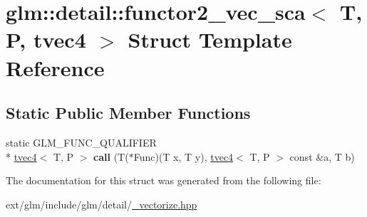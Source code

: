 \hypertarget{structglm_1_1detail_1_1functor2__vec__sca_3_01_t_00_01_p_00_01tvec4_01_4}{\section{glm\-:\-:detail\-:\-:functor2\-\_\-vec\-\_\-sca$<$ T, P, tvec4 $>$ Struct Template Reference}
\label{structglm_1_1detail_1_1functor2__vec__sca_3_01_t_00_01_p_00_01tvec4_01_4}
}
\subsection*{Static Public Member Functions}
\begin{DoxyCompactItemize}
\item 
\hypertarget{structglm_1_1detail_1_1functor2__vec__sca_3_01_t_00_01_p_00_01tvec4_01_4_ac8dcfe692f5b5d07ca805f981d58a913}{static G\-L\-M\-\_\-\-F\-U\-N\-C\-\_\-\-Q\-U\-A\-L\-I\-F\-I\-E\-R \\*
\hyperlink{structglm_1_1tvec4}{tvec4}$<$ T, P $>$ {\bfseries call} (T($\ast$Func)(T x, T y), \hyperlink{structglm_1_1tvec4}{tvec4}$<$ T, P $>$ const \&a, T b)}\label{structglm_1_1detail_1_1functor2__vec__sca_3_01_t_00_01_p_00_01tvec4_01_4_ac8dcfe692f5b5d07ca805f981d58a913}

\end{DoxyCompactItemize}


The documentation for this struct was generated from the following file\-:\begin{DoxyCompactItemize}
\item 
ext/glm/include/glm/detail/\hyperlink{__vectorize_8hpp}{\-\_\-vectorize.\-hpp}\end{DoxyCompactItemize}

